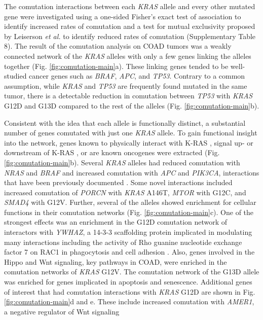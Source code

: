 \documentclass[english, 10pt, letterpaper]{article}
\newcommand{\KRAS}{\emph{KRAS}}
\newcommand{\kras}{K-RAS}
\begin{document}
The comutation interactions between each \KRAS{} allele and every other mutated gene were investigated using a one-sided Fisher's exact test of association to identify increased rates of comutation and a test for mutual exclusivity proposed by Leiserson \emph{et al.} \cite{Leiserson2016} to identify reduced rates of comutation (Supplementary Table 8).
The result of the comutation analysis on COAD tumors was a weakly connected network of the \KRAS{} alleles with only a few genes linking the alleles together (Fig. \ref{fig:comutation-main}a).
These linking genes tended to be well-studied cancer genes such as \emph{BRAF}, \emph{APC}, and \emph{TP53}.
Contrary to a common assumption, while \KRAS{} and \emph{TP53} are frequently found mutated in the same tumor, there is a detectable reduction in comutation between \emph{TP53} with \KRAS{} G12D and G13D compared to the rest of the alleles (Fig. \ref{fig:comutation-main}b).

Consistent with the idea that each allele is functionally distinct, a substantial number of genes comutated with just one \KRAS{} allele.
To gain functional insight into the network, genes known to physically interact with \kras{} \cite{Kovalski2019}, signal up- or downstream of \kras{} \cite{Kanehisa2017, Kanehisa2016KEGGAnnotation.}, or are known oncogenes \cite{Bamford2004TheWebsite., Sondka2018} were extracted (Fig. \ref{fig:comutation-main}b).
Several \KRAS{} alleles had reduced comutation with \emph{NRAS} and \emph{BRAF} and increased comutation with \emph{APC} and \emph{PIK3CA}, interactions that have been previously documented \cite{Sensi2006MutuallyMelanoma., Jauhri2017, Seth2009ConcomitantCancer., Cisowski2016, Janssen2006, Sakai2018, Kennedy2011, Wang2013, Green2015, Yeang2008CombinatorialCancer., CancerGenomeAtlasNetwork2012}. 
Some novel interactions included increased comutation of \emph{PORCN} with \KRAS{} A146T, \emph{MTOR} with G12C, and \emph{SMAD4} with G12V.
Further, several of the alleles showed enrichment for cellular functions in their comutation networks (Fig. \ref{fig:comutation-main}c).
One of the strongest effects was an enrichment in the G12D comutation network of interactors with \emph{YWHAZ}, a 14-3-3 scaffolding protein implicated in modulating many interactions including the activity of Rho guanine nucleotide exchange factor 7 on RAC1 in phagocytosis and cell adhesion \cite{Angrand2006TransgenicSignaling.}.
Also, genes involved in the Hippo and Wnt signaling, key pathways in COAD, were enriched in the comutation networks of \KRAS{} G12V.
The comutation network of the G13D allele was enriched for genes implicated in apoptosis and senescence.
Additional genes of interest that had comutation interactions with \KRAS{} G12D are shown in Fig. \ref{fig:comutation-main}d and e.
These include increased comutation with \emph{AMER1}, a negative regulator of Wnt signaling \cite{Grohmann2007AMER1Membrane., Tanneberger2011StructuralAmer1.}
\end{document}
